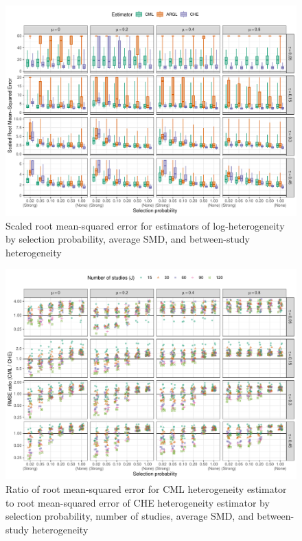 \documentclass[
  american,
  man, donotrepeattitle,mask,floatsintext]{apa7}
\numberwithin{table}{section}
\numberwithin{equation}{section}
\numberwithin{figure}{section}
\begin{document}
\begin{figure}
\includegraphics{step-function-selection-models-supplementary-materials_files/figure-latex/heterogeneity-rmse-1} \caption{Scaled root mean-squared error for estimators of log-heterogeneity by selection probability, average SMD, and between-study heterogeneity}\label{fig:heterogeneity-rmse}
\end{figure}

\begin{figure}
\includegraphics{step-function-selection-models-supplementary-materials_files/figure-latex/heterogeneity-rmse-CML-CHE-1} \caption{Ratio of root mean-squared error for CML heterogeneity estimator to root mean-squared error of CHE heterogeneity estimator by selection probability, number of studies, average SMD, and between-study heterogeneity}\label{fig:heterogeneity-rmse-CML-CHE}
\end{figure}
\end{document}
